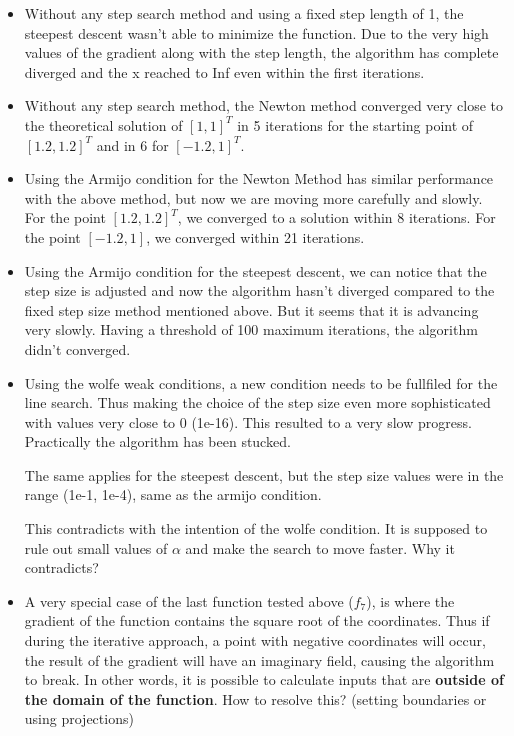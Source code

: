 \documentclass[a4paper,11pt]{article}
\numberwithin{equation}{section} %
\begin{document}
\begin{itemize}
    \item Without any step search method and using a fixed step length of 1, the steepest descent wasn't able to minimize the function. Due to the very high values of the gradient along with the step length, the algorithm has complete diverged and the x reached to Inf even within the first iterations.
    
    \item Without any step search method, the Newton method converged very close to the theoretical solution of $[1,1]^T$ in 5 iterations for the starting point of $[1.2,1.2]^T$ and in 6 for $[-1.2, 1]^T$.
    
    \item Using the Armijo condition for the Newton Method has similar performance with the above method, but now we are moving more carefully and slowly. For the point $[1.2,1.2]^T$, we converged to a solution within 8 iterations. For the point $[-1.2, 1]$, we converged within 21 iterations.
        
    \item Using the Armijo condition for the steepest descent, we can notice that the step size is adjusted and now the algorithm hasn't diverged compared to the fixed step size method mentioned above. But it seems that it is advancing very slowly. Having a threshold of 100 maximum iterations, the algorithm didn't converged.
    
    \item Using the wolfe weak conditions, a new condition needs to be fullfiled for the line search. Thus making the choice of the step size even more sophisticated with values very close to 0 (1e-16). This resulted to a very slow progress. Practically the algorithm has been stucked. 
    
    The same applies for the steepest descent, but the step size values were in the range (1e-1, 1e-4), same as the armijo condition.

    This contradicts with the intention of the wolfe condition. It is supposed to rule out small values of $\alpha$ and make the search to move faster. Why it contradicts?

    \item A very special case of the last function tested above ($f_7$), is where the gradient of the function contains the square root of the coordinates. Thus if during the iterative approach, a point with negative coordinates will occur, the result of the gradient will have an imaginary field, causing the algorithm to break. In other words, it is possible to calculate inputs that are \textbf{outside of the domain of the function}. How to resolve this? (setting boundaries or using projections)


\end{itemize}
\end{document}
